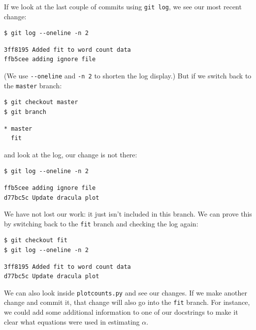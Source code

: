 \documentclass[
]{krantz}
\begin{document}
If we look at the last couple of commits using \texttt{git\ log},
we see our most recent change:

\begin{verbatim}
$ git log --oneline -n 2
\end{verbatim}

\begin{verbatim}
3ff8195 Added fit to word count data
ffb5cee adding ignore file
\end{verbatim}

(We use \texttt{-\/-oneline} and \texttt{-n~2} to shorten the log display.)
But if we switch back to the \texttt{master} branch:

\begin{verbatim}
$ git checkout master
$ git branch
\end{verbatim}

\begin{verbatim}
* master
  fit
\end{verbatim}

and look at the log,
our change is not there:

\begin{verbatim}
$ git log --oneline -n 2
\end{verbatim}

\begin{verbatim}
ffb5cee adding ignore file
d77bc5c Update dracula plot
\end{verbatim}

We have not lost our work:
it just isn't included in this branch.
We can prove this by switching back to the \texttt{fit} branch and checking the log again:

\begin{verbatim}
$ git checkout fit
$ git log --oneline -n 2
\end{verbatim}

\begin{verbatim}
3ff8195 Added fit to word count data
d77bc5c Update dracula plot
\end{verbatim}

We can also look inside \texttt{plotcounts.py} and see our changes.
If we make another change and commit it,
that change will also go into the \texttt{fit} branch.
For instance,
we could add some additional information to one of our docstrings
to make it clear what equations were used in estimating \(\alpha\).
\end{document}
